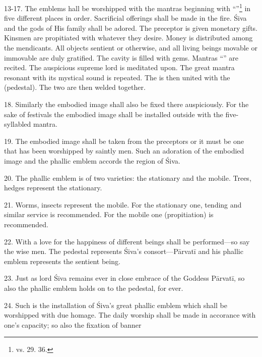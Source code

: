 13-17. The emblems hall be worshipped with the mantras beginning with
“”\footnote{vs. 29. 36.} in five different places in order.
Sacrificial offerings shall be made in the fire. Śiva and the gods of His family
shall be adored. The preceptor is given monetary gifts. Kinsmen are propitiated
with whatever they desire. Money is distributed among the mendicants. All
objects sentient or otherwise, and all living beings movable or immovable are
duly gratified. The cavity is filled with gems. Mantras “” \etc are
recited. The auspicious supreme lord is meditated upon. The great mantra
 resonant with its mystical sound is repeated. The  is then
united with the  (pedestal). The two are then welded together.

18. Similarly the embodied image shall also be fixed there auspiciously. For
the sake of festivals the embodied image shall be installed outside with the
five-syllabled mantra.

19. The embodied image shall be taken from the preceptors or it must be one that
has been worshipped by saintly men. Such an adoration of the embodied image and
the phallic emblem accords the region of Śiva.

20. The phallic emblem is of two varieties: the stationary and the mobile. Trees,
hedges \etc represent the stationary.

21. Worms, insects \etc represent the mobile. For the stationary one, tending
and similar service is recommended. For the mobile one 
(propitiation) is recommended.

22. With a love for the happiness of different beings  shall be
performed—so say the wise men. The pedestal represents Śiva’s consort—Pārvatī
and his phallic emblem represents the sentient being.

23. Just as lord Śiva remains ever in close embrace of the Goddess Pārvatī, so
also the phallic emblem holds on to the pedestal, for ever.

24. Such is the installation of Śiva’s great phallic emblem which shall be
worshipped with due homage. The daily worship shall be made in accorance with
one’s capacity; so also the fixation of banner \etc

